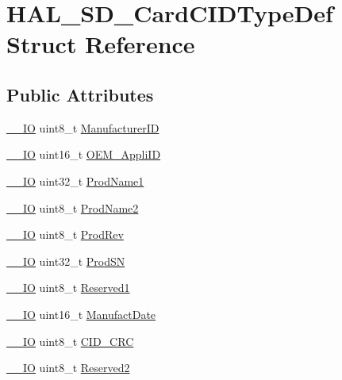 \hypertarget{struct_h_a_l___s_d___card_c_i_d_type_def}{}\section{H\+A\+L\+\_\+\+S\+D\+\_\+\+Card\+C\+I\+D\+Type\+Def Struct Reference}
\label{struct_h_a_l___s_d___card_c_i_d_type_def}
\subsection*{Public Attributes}
\begin{DoxyCompactItemize}
\item 
\mbox{\hyperlink{core__sc300_8h_aec43007d9998a0a0e01faede4133d6be}{\+\_\+\+\_\+\+IO}} uint8\+\_\+t \mbox{\hyperlink{struct_h_a_l___s_d___card_c_i_d_type_def_a367b5161e38935d927c0fa397e14e53a}{Manufacturer\+ID}}
\item 
\mbox{\hyperlink{core__sc300_8h_aec43007d9998a0a0e01faede4133d6be}{\+\_\+\+\_\+\+IO}} uint16\+\_\+t \mbox{\hyperlink{struct_h_a_l___s_d___card_c_i_d_type_def_a2f200760465191af5374539906c67074}{O\+E\+M\+\_\+\+Appli\+ID}}
\item 
\mbox{\hyperlink{core__sc300_8h_aec43007d9998a0a0e01faede4133d6be}{\+\_\+\+\_\+\+IO}} uint32\+\_\+t \mbox{\hyperlink{struct_h_a_l___s_d___card_c_i_d_type_def_a8168261b0126c02ee5ae9107399bf8e5}{Prod\+Name1}}
\item 
\mbox{\hyperlink{core__sc300_8h_aec43007d9998a0a0e01faede4133d6be}{\+\_\+\+\_\+\+IO}} uint8\+\_\+t \mbox{\hyperlink{struct_h_a_l___s_d___card_c_i_d_type_def_ae79566103dbc229aa43ba5ed96379986}{Prod\+Name2}}
\item 
\mbox{\hyperlink{core__sc300_8h_aec43007d9998a0a0e01faede4133d6be}{\+\_\+\+\_\+\+IO}} uint8\+\_\+t \mbox{\hyperlink{struct_h_a_l___s_d___card_c_i_d_type_def_a376186fd7674adba95bc6a4a460ba923}{Prod\+Rev}}
\item 
\mbox{\hyperlink{core__sc300_8h_aec43007d9998a0a0e01faede4133d6be}{\+\_\+\+\_\+\+IO}} uint32\+\_\+t \mbox{\hyperlink{struct_h_a_l___s_d___card_c_i_d_type_def_ac41a0112d5ee8df09f804e22b1896a81}{Prod\+SN}}
\item 
\mbox{\hyperlink{core__sc300_8h_aec43007d9998a0a0e01faede4133d6be}{\+\_\+\+\_\+\+IO}} uint8\+\_\+t \mbox{\hyperlink{struct_h_a_l___s_d___card_c_i_d_type_def_a1048105437a4744cb6ac946425c51624}{Reserved1}}
\item 
\mbox{\hyperlink{core__sc300_8h_aec43007d9998a0a0e01faede4133d6be}{\+\_\+\+\_\+\+IO}} uint16\+\_\+t \mbox{\hyperlink{struct_h_a_l___s_d___card_c_i_d_type_def_ab2613eff6b70f9defb519ad2df7701a6}{Manufact\+Date}}
\item 
\mbox{\hyperlink{core__sc300_8h_aec43007d9998a0a0e01faede4133d6be}{\+\_\+\+\_\+\+IO}} uint8\+\_\+t \mbox{\hyperlink{struct_h_a_l___s_d___card_c_i_d_type_def_a635d227552f1e0cb540590cfbfff1cb7}{C\+I\+D\+\_\+\+C\+RC}}
\item 
\mbox{\hyperlink{core__sc300_8h_aec43007d9998a0a0e01faede4133d6be}{\+\_\+\+\_\+\+IO}} uint8\+\_\+t \mbox{\hyperlink{struct_h_a_l___s_d___card_c_i_d_type_def_a7d03d483cd6efcdf1c4dd3089ee0fb10}{Reserved2}}
\end{DoxyCompactItemize}


